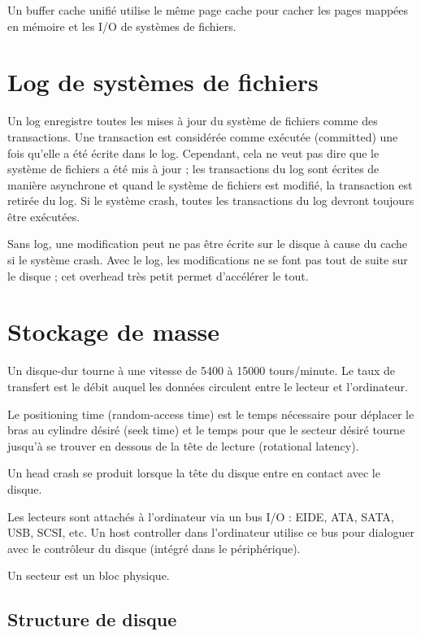 	Un buffer cache unifié utilise le même page cache pour cacher les pages mappées en mémoire et les I/O de systèmes de fichiers.
	
	
\section{Log de systèmes de fichiers}

Un log enregistre toutes les mises à jour du système de fichiers comme des transactions. Une transaction est considérée comme exécutée (committed) une fois qu'elle a été écrite dans le log. Cependant, cela ne veut pas dire que le système de fichiers a été mis à jour ; les transactions du log sont écrites de manière asynchrone  et quand le système de fichiers est modifié, la transaction est retirée du log. Si le système crash, toutes les transactions du log devront toujours être exécutées.

Sans log, une modification peut ne pas être écrite sur le disque à cause du cache si le système crash. Avec le log, les modifications ne se font pas tout de suite sur le disque ; cet overhead très petit permet d'accélérer le tout.

\section{Stockage de masse}

Un disque-dur tourne à une vitesse de 5400 à 15000 tours/minute. Le taux de transfert est le débit auquel les données circulent entre le lecteur et l'ordinateur.

Le positioning time (random-access time) est le temps nécessaire pour déplacer le bras au cylindre désiré (seek time) et le temps pour que le secteur désiré tourne jusqu'à se trouver en dessous de la tête de lecture (rotational latency).

Un head crash se produit lorsque la tête du disque entre en contact avec le disque.

Les lecteurs sont attachés à l'ordinateur via un bus I/O : EIDE, ATA, SATA, USB, SCSI, etc. Un host controller dans l'ordinateur utilise ce bus pour dialoguer avec le contrôleur du disque (intégré dans le périphérique).

Un secteur est un bloc physique.


	\subsection{Structure de disque}
	
